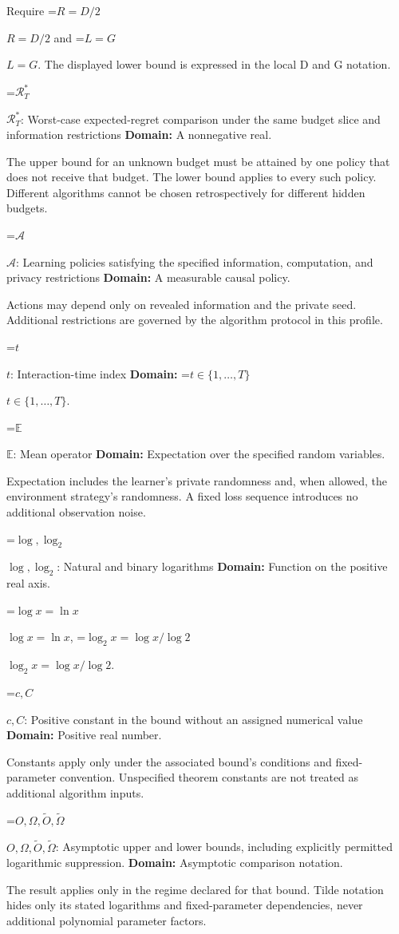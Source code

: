 \documentclass[10pt,a4paper]{article}
\newcommand{\AtlasMath}[1]{\par\begingroup\centering\setbox0=\hbox{$\displaystyle #1$}\ifdim\wd0>1.4\linewidth\typeout{ATLAS WIDE FORMULA: \the\wd0}\fi\ifdim\wd0>\linewidth\resizebox{\linewidth}{!}{\box0}\else\box0\fi\par\endgroup}
\newcommand{\AtlasInlineMath}[1]{\begingroup\setbox0=\hbox{$#1$}\ifdim\wd0>.4\linewidth\endgroup\AtlasMath{#1}\else\endgroup$#1$\fi}
\begin{document}
Require \AtlasInlineMath{R=D/2} and \AtlasInlineMath{L=G}. The displayed lower bound is expressed in the local D and G notation.

\AtlasInlineMath{\mathcal R_T^*}: Worst-case expected-regret comparison under the same budget slice and information restrictions \textbf{Domain:} A nonnegative real.

The upper bound for an unknown budget must be attained by one policy that does not receive that budget. The lower bound applies to every such policy. Different algorithms cannot be chosen retrospectively for different hidden budgets.

\AtlasInlineMath{\mathcal A}: Learning policies satisfying the specified information, computation, and privacy restrictions \textbf{Domain:} A measurable causal policy.

Actions may depend only on revealed information and the private seed. Additional restrictions are governed by the algorithm protocol in this profile.

\AtlasInlineMath{t}: Interaction-time index \textbf{Domain:} \AtlasInlineMath{t\in\{1,\ldots,T\}}.

\AtlasInlineMath{\mathbb E}: Mean operator \textbf{Domain:} Expectation over the specified random variables.

Expectation includes the learner's private randomness and, when allowed, the environment strategy's randomness. A fixed loss sequence introduces no additional observation noise.

\AtlasInlineMath{\log,\log_2}: Natural and binary logarithms \textbf{Domain:} Function on the positive real axis.

\AtlasInlineMath{\log x=\ln x}, \AtlasInlineMath{\log_2x=\log x/\log2}.

\AtlasInlineMath{c,C}: Positive constant in the bound without an assigned numerical value \textbf{Domain:} Positive real number.

Constants apply only under the associated bound’s conditions and fixed-parameter convention. Unspecified theorem constants are not treated as additional algorithm inputs.

\AtlasInlineMath{O,\Omega,\widetilde O,\widetilde\Omega}: Asymptotic upper and lower bounds, including explicitly permitted logarithmic suppression. \textbf{Domain:} Asymptotic comparison notation.

The result applies only in the regime declared for that bound. Tilde notation hides only its stated logarithms and fixed-parameter dependencies, never additional polynomial parameter factors.
\end{document}
